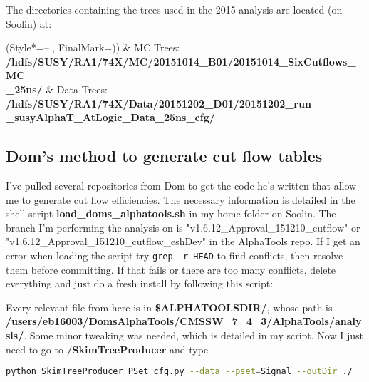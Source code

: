The directories containing the trees used in the 2015 analysis are located (on Soolin) at:

\begin{easylist}
\ListProperties(Style*=-- , FinalMark={)})
& MC Trees: \textbf{/hdfs/SUSY/RA1/74X/MC/20151014\_B01/20151014\_SixCutflows\_MC\\\_25ns/}
& Data Trees: \textbf{/hdfs/SUSY/RA1/74X/Data/20151202\_D01/20151202\_run\\\_susyAlphaT\_AtLogic\_Data\_25ns\_cfg/}
\end{easylist}

\subsection{Dom's method to generate cut flow tables}
\label{subsubsec:currentprocedurecutflows}

I've pulled several repositories from Dom to get the code he's written that allow me to generate cut flow efficiencies. The necessary information is detailed in the shell script \textbf{load\_doms\_alphatools.sh} in my home folder on Soolin. The branch I'm performing the analysis on is "v1.6.12\_Approval\_151210\_cutflow" or "v1.6.12\_Approval\_151210\_cutflow\_eshDev" in the AlphaTools repo. If I get an error when loading the script try \verb!grep -r HEAD! to find conflicts, then resolve them before committing. If that fails or there are too many conflicts, delete everything and just do a fresh install by following this script:



Every relevant file from here is in \textbf{\$ALPHATOOLSDIR/}, whose path is \textbf{/users/eb16003/DomsAlphaTools/CMSSW\_7\_4\_3/AlphaTools/analysis/}. Some minor tweaking was needed, which is detailed in my script. Now I just need to go to \textbf{/SkimTreeProducer} and type

\begin{lstlisting}[belowskip=-0.7cm, language=sh, numbers=none]
python SkimTreeProducer_PSet_cfg.py --data --pset=Signal --outDir ./
\end{lstlisting}

